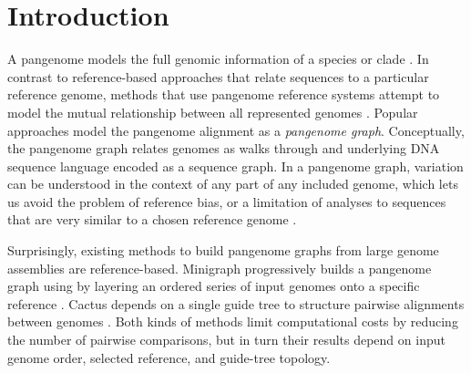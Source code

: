 \documentclass{bioinfo}
\theoremstyle{definition}
\begin{document}
\maketitle


\section{Introduction}
\label{sec:introduction}
A pangenome models the full genomic information of a species or clade \citep{Medini_2005,Sherman_2020}.
In contrast to reference-based approaches that relate sequences to a particular reference genome, methods that use pangenome reference systems attempt to model the mutual relationship between all represented genomes \citep{cpang2018}.
Popular approaches model the pangenome alignment as a \textit{pangenome graph}.
Conceptually, the pangenome graph relates genomes as walks through and underlying DNA sequence language encoded as a sequence graph. 
In a pangenome graph, variation can be understood in the context of any part of any included genome, which lets us avoid the problem of reference bias, or a limitation of analyses to sequences that are very similar to a chosen reference genome \citep{Eizenga_2020}.

Surprisingly, existing methods to build pangenome graphs from large genome assemblies are reference-based.
Minigraph progressively builds a pangenome graph using by layering an ordered series of input genomes onto a specific reference \citep{Li:2020}.
Cactus depends on a single guide tree to structure pairwise alignments between genomes \citep{Armstrong:2020}.
Both kinds of methods limit computational costs by reducing the number of pairwise comparisons, but in turn their results depend on input genome order, selected reference, and guide-tree topology.
\end{document}
